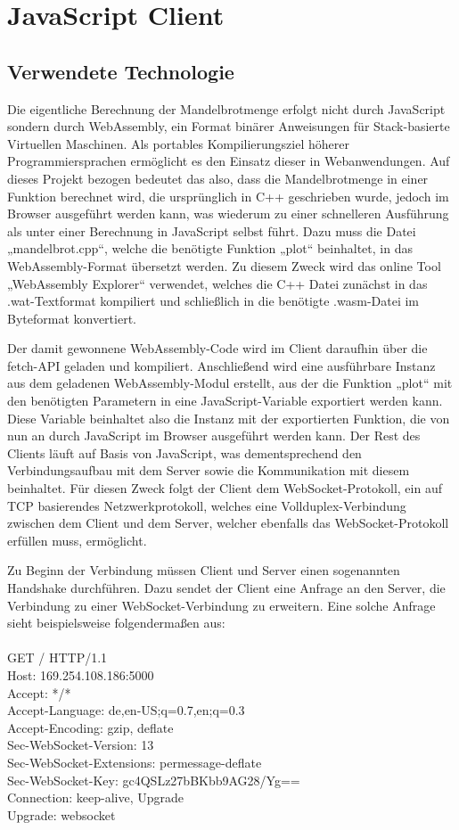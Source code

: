 \documentclass[12pt, onecolumn,notitlepage]{scrartcl}
\begin{document}
\section{JavaScript Client}
\subsection{Verwendete Technologie}
Die eigentliche Berechnung der Mandelbrotmenge erfolgt nicht durch JavaScript sondern durch WebAssembly, ein Format binärer Anweisungen für Stack-basierte Virtuellen Maschinen. Als portables Kompilierungsziel höherer Programmiersprachen ermöglicht es den Einsatz dieser in Webanwendungen.  Auf dieses Projekt bezogen bedeutet das also, dass die Mandelbrotmenge in einer Funktion berechnet wird, die ursprünglich in C++ geschrieben wurde, jedoch im Browser ausgeführt werden kann, was wiederum zu einer schnelleren Ausführung als unter einer Berechnung in JavaScript selbst führt. Dazu muss die Datei „mandelbrot.cpp“, welche die benötigte Funktion „plot“ beinhaltet, in das WebAssembly-Format übersetzt werden. Zu diesem Zweck wird das online Tool „WebAssembly Explorer“ verwendet, welches die C++ Datei zunächst in das .wat-Textformat kompiliert und schließlich in die benötigte .wasm-Datei im Byteformat konvertiert. \par
Der damit gewonnene WebAssembly-Code wird im Client daraufhin über die fetch-API geladen und kompiliert. Anschließend wird eine ausführbare Instanz aus dem geladenen WebAssembly-Modul erstellt, aus der die Funktion „plot“ mit den benötigten Parametern in eine JavaScript-Variable exportiert werden kann. Diese Variable beinhaltet also die Instanz mit der exportierten Funktion, die von nun an durch JavaScript im Browser ausgeführt werden kann.
Der Rest des Clients läuft auf Basis von JavaScript, was dementsprechend den Verbindungsaufbau mit dem Server sowie die Kommunikation mit diesem beinhaltet. Für diesen Zweck folgt der Client dem WebSocket-Protokoll, ein auf TCP basierendes Netzwerkprotokoll, welches eine Vollduplex-Verbindung zwischen dem Client und dem Server, welcher ebenfalls das WebSocket-Protokoll erfüllen muss, ermöglicht. \par
Zu Beginn der Verbindung müssen Client und Server einen sogenannten Handshake durchführen. Dazu sendet der Client eine Anfrage an den Server, die Verbindung zu einer WebSocket-Verbindung zu erweitern. Eine solche Anfrage sieht beispielsweise folgendermaßen aus: \\ \\
GET / HTTP/1.1 \\
Host: 169.254.108.186:5000 \\
Accept: */* \\
Accept-Language: de,en-US;q=0.7,en;q=0.3 \\
Accept-Encoding: gzip, deflate \\
Sec-WebSocket-Version: 13 \\
Sec-WebSocket-Extensions: permessage-deflate \\
Sec-WebSocket-Key: gc4QSLz27bBKbb9AG28/Yg== \\
Connection: keep-alive, Upgrade \\
Upgrade: websocket \\
\end{document}
